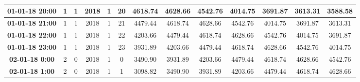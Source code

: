 \begin{table}[h!]
{\begin{tabular}{|c|c|c|c|c|c|c|c|c|c|c|c|c|}
\textbf{01-01-18 20:00} & 1                & 1                & 2018          & 1              & 20            & 4618.74     & 4628.66           & 4542.76           & 4014.75           & 3691.87           & 3613.31           & 3588.58           \\ \hline
\textbf{01-01-18 21:00} & 1                & 1                & 2018          & 1              & 21            & 4479.44     & 4618.74           & 4628.66           & 4542.76           & 4014.75           & 3691.87           & 3613.31           \\ \hline
\textbf{01-01-18 22:00} & 1                & 1                & 2018          & 1              & 22            & 4203.66     & 4479.44           & 4618.74           & 4628.66           & 4542.76           & 4014.75           & 3691.87           \\ \hline
\textbf{01-01-18 23:00} & 1                & 1                & 2018          & 1              & 23            & 3931.89     & 4203.66           & 4479.44           & 4618.74           & 4628.66           & 4542.76           & 4014.75           \\ \hline
\textbf{02-01-18 0:00}  & 2                & 0                & 2018          & 1              & 0             & 3490.90     & 3931.89           & 4203.66           & 4479.44           & 4618.74           & 4628.66           & 4542.76           \\ \hline
\textbf{02-01-18 1:00}  & 2                & 0                & 2018          & 1              & 1             & 3098.82     & 3490.90           & 3931.89           & 4203.66           & 4479.44           & 4618.74           & 4628.66           \\ \hline
\end{tabular}}
\end{table}



